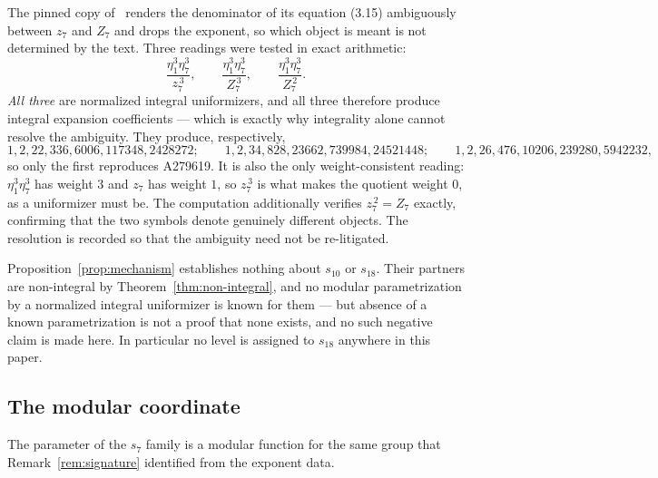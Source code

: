\begin{remark}
\label{rem:315}
The pinned copy of~\cite{OBrien2016} renders the denominator of its equation
(3.15) ambiguously between $z_7$ and $Z_7$ and drops the exponent, so which
object is meant is not determined by the text. Three readings were tested in
exact arithmetic:
\[
  \frac{\eta_1^3\eta_7^3}{z_7^{\,3}}, \qquad
  \frac{\eta_1^3\eta_7^3}{Z_7^{\,3}}, \qquad
  \frac{\eta_1^3\eta_7^3}{Z_7^{\,2}} .
\]
\emph{All three} are normalized integral uniformizers, and all three therefore
produce integral expansion coefficients --- which is exactly why integrality
alone cannot resolve the ambiguity. They produce, respectively,
\[
  1,2,22,336,6006,117348,2428272; \qquad
  1,2,34,828,23662,739984,24521448; \qquad
  1,2,26,476,10206,239280,5942232,
\]
so only the first reproduces A279619. It is also the only weight-consistent
reading: $\eta_1^3\eta_7^3$ has weight $3$ and $z_7$ has weight $1$, so
$z_7^{\,3}$ is what makes the quotient weight $0$, as a uniformizer must be.
The computation additionally verifies $z_7^{\,2} = Z_7$ exactly, confirming
that the two symbols denote genuinely different objects. The resolution is
recorded so that the ambiguity need not be re-litigated.
\end{remark}

\begin{remark}[Scope]\label{rem:integrality-scope}
Proposition~\ref{prop:mechanism} establishes nothing about $s_{10}$ or
$s_{18}$. Their partners are non-integral by Theorem~\ref{thm:non-integral},
and no modular parametrization by a normalized integral uniformizer is known
for them --- but absence of a known parametrization is not a proof that none
exists, and no such negative claim is made here. In particular no level is
assigned to $s_{18}$ anywhere in this paper.
\end{remark}

\subsection{The modular coordinate}

The parameter of the $s_7$ family is a modular function for the same group
that Remark~\ref{rem:signature} identified from the exponent data.


